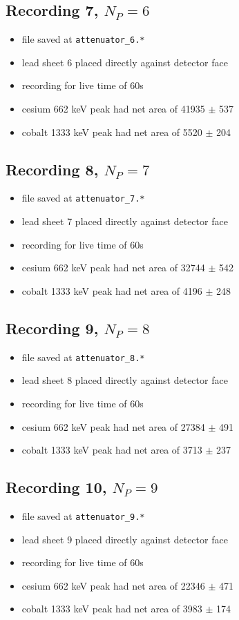 \documentclass[a4paper]{article}
\begin{document}
\subsection{Recording 7, $N_{P}=6$}
\begin{itemize}
    \item file saved at \verb|attenuator_6.*|
    \item lead sheet 6 placed directly against detector face
    \item recording for live time of 60s
    \item cesium 662 keV peak had net area of 41935 $\pm$ 537
    \item cobalt 1333 keV peak had net area of 5520 $\pm$ 204
\end{itemize}

\subsection{Recording 8, $N_{P}=7$}
\begin{itemize}
    \item file saved at \verb|attenuator_7.*|
    \item lead sheet 7 placed directly against detector face
    \item recording for live time of 60s
    \item cesium 662 keV peak had net area of 32744 $\pm$ 542
    \item cobalt 1333 keV peak had net area of 4196 $\pm$ 248
\end{itemize}

\subsection{Recording 9, $N_{P}=8$}
\begin{itemize}
    \item file saved at \verb|attenuator_8.*|
    \item lead sheet 8 placed directly against detector face
    \item recording for live time of 60s
    \item cesium 662 keV peak had net area of 27384 $\pm$ 491
    \item cobalt 1333 keV peak had net area of 3713 $\pm$ 237
\end{itemize}

\subsection{Recording 10, $N_{P}=9$}
\begin{itemize}
    \item file saved at \verb|attenuator_9.*|
    \item lead sheet 9 placed directly against detector face
    \item recording for live time of 60s
    \item cesium 662 keV peak had net area of 22346 $\pm$ 471
    \item cobalt 1333 keV peak had net area of 3983 $\pm$ 174
\end{itemize}
\end{document}
